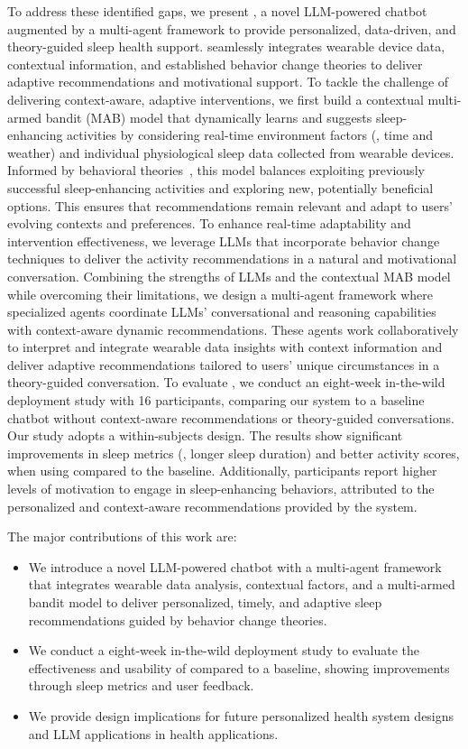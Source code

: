 To address these identified gaps, we present \name{}, a novel LLM-powered chatbot augmented by a multi-agent framework to provide personalized, data-driven, and theory-guided sleep health support. 
\name{} seamlessly integrates wearable device data, contextual information, and established behavior change theories to deliver adaptive recommendations and motivational support. 
To tackle the challenge of delivering context-aware, adaptive interventions, 
we first build a contextual multi-armed bandit (MAB) model that dynamically learns and suggests sleep-enhancing activities by considering real-time environment factors (\eg, time and weather) and individual physiological sleep data collected from wearable devices.
Informed by behavioral theories~\cite{bandura1977self,lally2010habits}, this model balances exploiting previously successful sleep-enhancing activities and exploring new, potentially beneficial options. This ensures that recommendations remain relevant and adapt to users' evolving contexts and preferences.
To enhance real-time adaptability and intervention effectiveness, we leverage LLMs that incorporate behavior change techniques to deliver the activity recommendations in a natural and motivational conversation.
Combining the strengths of LLMs and the contextual MAB model while overcoming their limitations, we design a multi-agent framework where specialized agents coordinate LLMs' conversational and reasoning capabilities with context-aware dynamic recommendations. 
These agents work collaboratively to interpret and integrate wearable data insights with context information and deliver adaptive recommendations tailored to users' unique circumstances in a theory-guided conversation.
To evaluate \name{}, we conduct an eight-week in-the-wild deployment study with 16 participants, comparing our system to a baseline chatbot without context-aware recommendations or theory-guided conversations.
Our study adopts a within-subjects design.
The results show significant improvements in sleep metrics (\eg, longer sleep duration) and better activity scores, when using \name{} compared to the baseline. Additionally, participants report higher levels of motivation to engage in sleep-enhancing behaviors, attributed to the personalized and context-aware recommendations provided by the system.


The major contributions of this work are:
\begin{itemize}
    \item We introduce a novel LLM-powered chatbot with a multi-agent framework that integrates wearable data analysis, contextual factors, and a multi-armed bandit model to deliver personalized, timely, and adaptive sleep recommendations guided by behavior change theories.
    \item We conduct a eight-week in-the-wild deployment study to evaluate the effectiveness and usability of \name{} compared to a baseline, showing improvements through sleep metrics and user feedback.
    \item We provide design implications for future personalized health system designs and LLM applications in health applications. 
\end{itemize}


